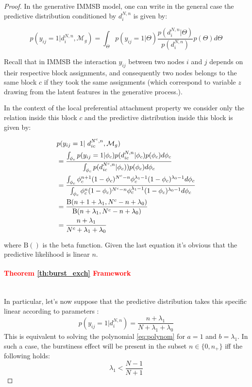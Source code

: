 \begin{proof}
In the generative IMMSB model, one can write in the general case the predictive distribution conditioned by $d_i^{N,n}$ is given by:

\begin{equation} 
p(y_{ij} = 1 | d_i^{N,n}, \mathcal{M}_g) = \int_{\Theta} p(y_{ij}=1|\Theta) \frac{p(d_i^{N,n} | \Theta)}{p(d_i^{N,n})} p(\Theta) d\Theta \nonumber
\end{equation}

Recall that in IMMSB the interaction $y_{ij}$ between two nodes $i$ and $j$ depends on their respective block assignments, and consequently two nodes belongs to the same block $c$ if they took the same assignments (which correspond to variable $z$ drawing from the latent features in the generative process.).

In the context of the local preferential attachment property we consider only the relation inside this block $c$ and the predictive distribution inside this block is given by:

\begin{align*} \label{eq:sum}
&p(y_{ij} = 1 | d_{ic}^{N^c,n}, \mathcal{M}_g)  \\
&=  \frac{ \int_{\phi_{c}} p(y_{ij}=1|\phi_{c}) p(d_{ic}^{N,n} | \phi_{c}) p(\phi_{c}) d\phi_{c}}{\int_{\phi_{c}} \p(d_{ic}^{N^c,n} | \phi_{c}))       p(\phi_{c}) d\phi_{c}}   \\
&= \frac{\int_{\phi_c} \phi_c^{n+1}(1-\phi_c)^{N^c-n} \phi_c^{\lambda_1-1} (1-\phi_c)^{\lambda_0-1} d\phi_{c}}{\int_{\phi_c} \phi_c^{n}(1-\phi_c)^{N^c-n} \phi_c^{\lambda_1-1} (1-\phi_c)^{\lambda_0-1} d\phi_{c}} \\
&= \frac{ \text{B}(n+1+\lambda_1, N^c-n+\lambda_0) }{\text{B}(n+\lambda_1, N^c-n+\lambda_0)} \\
&= \frac{n+\lambda_1}{N^c + \lambda_1 +\lambda_0}
\end{align*}

where $\text{B}()$ is the beta function. Given the last equation it's obvious that the  predictive likelihood is linear $n$.

    \paragraph{\textcolor{red}{Theorem \ref{th:burst_exch} Framework }}~\\

In particular,  let's now suppose that the predictive distribution takes this specific linear according to parameters :
\begin{equation}
p(y_{ij}=1 | d_i^{N,n}) = \frac{n+\lambda_1}{N+\lambda_1+\lambda_0}
\end{equation}
    This is equivalent to solving the polynomial \eqref{eq:polynom} for $a=1$ and $b=\lambda_1$. In such a case, the burstiness effect will be present in the subset $n \in \{0, n_+\}$ iff the following holds:
\begin{equation}
\lambda_1 < \frac{N-1}{N+1}
\end{equation}


\end{proof}
